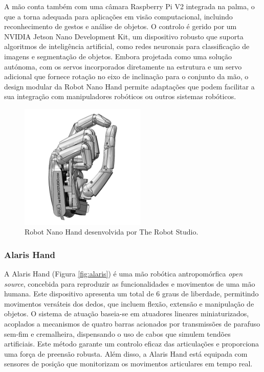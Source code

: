 A mão conta também com uma câmara Raspberry Pi V2 integrada na palma, o que a torna adequada para aplicações em visão computacional, incluindo reconhecimento de gestos e análise de objetos. O controlo é gerido por um NVIDIA Jetson Nano Development Kit, um dispositivo robusto que suporta algoritmos de inteligência artificial, como redes neuronais para classificação de imagens e segmentação de objetos.
Embora projetada como uma solução autónoma, com os servos incorporados diretamente na estrutura e um servo adicional que fornece rotação no eixo de inclinação para o conjunto da mão, o design modular da Robot Nano Hand permite adaptações que podem facilitar a sua integração com manipuladores robóticos ou outros sistemas robóticos.

\begin{figure}[H]
    \centering
    \includegraphics[height=6cm,keepaspectratio]{figs/chapter2/nano.png}
    \caption{Robot Nano Hand desenvolvida por The Robot Studio\cite{Nano}.}
    \label{fig:nano}
    
\end{figure}


\subsubsection{Alaris Hand}

A Alaris Hand \cite{Nurpeissova2021} (Figura \ref{fig:alaris}) é uma mão robótica antropomórfica \textit{open source}, concebida para reproduzir as funcionalidades e movimentos de uma mão humana. 
Este dispositivo apresenta um total de 6 graus de liberdade, permitindo movimentos versáteis dos dedos, que incluem flexão, extensão e manipulação de objetos. 
O sistema de atuação baseia-se em atuadores lineares miniaturizados, acoplados a mecanismos de quatro barras acionados por transmissões de parafuso sem-fim e cremalheira, dispensando o uso de cabos que simulem tendões artificiais. 
Este método garante um controlo eficaz das articulações e proporciona uma força de preensão robusta.
Além disso, a Alaris Hand está equipada com sensores de posição que monitorizam os movimentos articulares em tempo real. 

